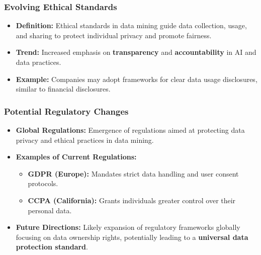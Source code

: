 \documentclass[aspectratio=169]{beamer}
\begin{document}
\begin{frame}[fragile]
    \frametitle{Evolving Ethical Standards}
    \begin{itemize}
        \item \textbf{Definition:} Ethical standards in data mining guide data collection, usage, and sharing to protect individual privacy and promote fairness.
        \item \textbf{Trend:} Increased emphasis on \textbf{transparency} and \textbf{accountability} in AI and data practices.
        \item \textbf{Example:} Companies may adopt frameworks for clear data usage disclosures, similar to financial disclosures.
    \end{itemize}
\end{frame}

\begin{frame}[fragile]
    \frametitle{Potential Regulatory Changes}
    \begin{itemize}
        \item \textbf{Global Regulations:} Emergence of regulations aimed at protecting data privacy and ethical practices in data mining.
        \item \textbf{Examples of Current Regulations:}
        \begin{itemize}
            \item \textbf{GDPR (Europe):} Mandates strict data handling and user consent protocols.
            \item \textbf{CCPA (California):} Grants individuals greater control over their personal data.
        \end{itemize}
        \item \textbf{Future Directions:} Likely expansion of regulatory frameworks globally focusing on data ownership rights, potentially leading to a \textbf{universal data protection standard}.
    \end{itemize}
\end{frame}
\end{document}
